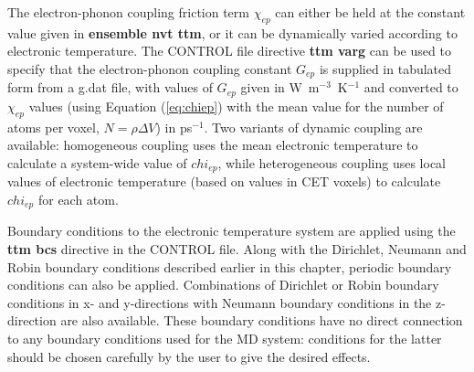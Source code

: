 The electron-phonon coupling
friction term $\chi_{ep}$ can either be held at
the constant value given in {\bf ensemble nvt ttm}, or it can be dynamically
varied according to electronic temperature. The CONTROL file directive
{\bf ttm varg} can be used to specify that the electron-phonon coupling
constant $G_{ep}$ is supplied in tabulated form from a g.dat file, with
values of $G_{ep}$ given in W~m$^{-3}$~K$^{-1}$ and converted to
$\chi_{ep}$ values (using Equation (\ref{eq:chiep}) with the mean value for
the number of atoms per voxel, $N = \rho \Delta V$) in ps$^{-1}$. Two
variants of dynamic coupling are available: homogeneous coupling
uses the mean electronic temperature to calculate a system-wide value
of $chi_{ep}$, while heterogeneous coupling uses local values of
electronic temperature (based on values in CET voxels) to calculate
$chi_{ep}$ for each atom.

Boundary conditions
to the electronic temperature system are applied
using the {\bf ttm bcs} directive in the CONTROL file. Along with the
Dirichlet, Neumann and Robin boundary conditions described earlier in
this chapter, periodic boundary conditions can also be applied.
Combinations of Dirichlet or Robin boundary conditions in x- and
y-directions with Neumann boundary conditions in the z-direction are
also available. These boundary conditions have no direct connection to
any boundary conditions used for the MD system: conditions for the
latter should be chosen carefully by the user to give the desired effects.

